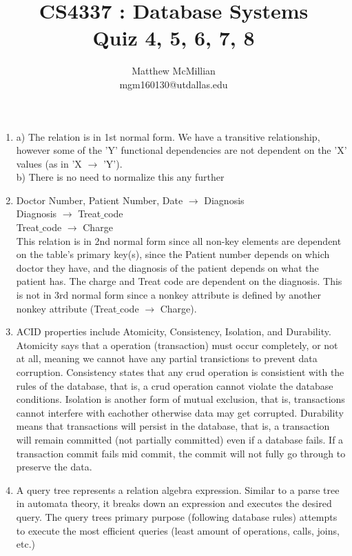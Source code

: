 \documentclass[12pt]{article}
\begin{document}
\title{CS4337 : Database Systems\\Quiz 4, 5, 6, 7, 8 }
\author{Matthew McMillian\\mgm160130@utdallas.edu}
\maketitle


\begin{enumerate}
	
	\item a) The relation is in 1st normal form. We have a transitive relationship, however some of the 'Y' functional dependencies are not dependent on the 'X' values (as in 'X $\rightarrow$ 'Y'). \\
b) There is no need to normalize this any further

	\item Doctor Number, Patient Number, Date $\rightarrow$ Diagnosis\\
Diagnosis $\rightarrow$ Treat$\_$code\\
Treat$\_$code $\rightarrow$ Charge\\

This relation is in 2nd normal form since all non-key elements are dependent on the table's primary key(s), since the Patient number depends on which doctor
they have, and the diagnosis of the patient depends on what the patient has. The charge and Treat code are dependent on the diagnosis. This is not in 3rd
normal form since a nonkey attribute is defined by another nonkey attribute (Treat$\_$code $\rightarrow$ Charge).

	\item ACID properties include Atomicity, Consistency, Isolation, and Durability. Atomicity says that a operation (transaction) must occur completely, or not at all,
meaning we cannot have any partial transictions to prevent data corruption. Consistency states that any crud operation is consistient with the rules of the
database, that is, a crud operation cannot violate the database conditions. Isolation is another form of mutual exclusion, that is, transactions cannot interfere
with eachother otherwise data may get corrupted. Durability means that transactions will persist in the database, that is, a transaction will remain committed
(not partially committed) even if a database fails. If a transaction commit fails mid commit, the commit will not fully go through to preserve the data.

	\item A query tree represents a relation algebra expression. Similar to a parse tree in automata theory, it breaks down an expression and executes the desired query.
The query trees primary purpose (following database rules) attempts to execute the most efficient queries (least amount of operations, calls, joins, etc.)


\end{enumerate}
\end{document}
